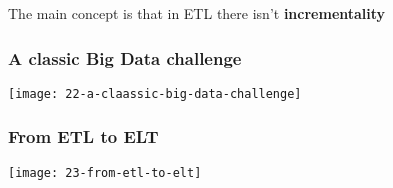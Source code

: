 The main concept is that in ETL there isn't \textbf{incrementality}

\subsubsection{A classic Big Data challenge}
\begin{center}
\texttt{[image: 22-a-claassic-big-data-challenge]}
\end{center}

\subsubsection{From ETL to ELT}

\begin{center}
\texttt{[image: 23-from-etl-to-elt]}
\end{center}